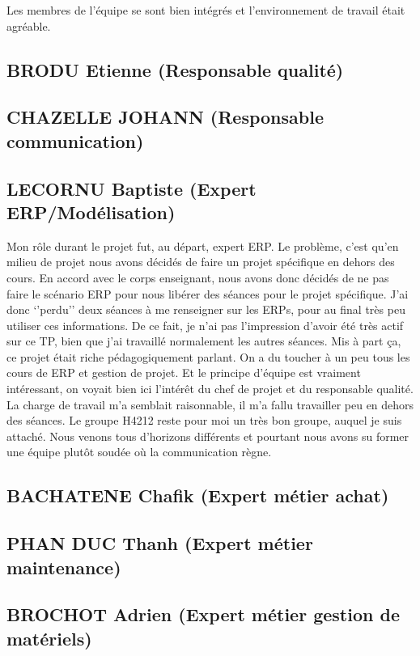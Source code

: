 Les membres de l'équipe se sont bien intégrés et l'environnement de travail était agréable.

       \subsection{BRODU Etienne (Responsable qualité)}

       \subsection{CHAZELLE JOHANN (Responsable communication)}

       \subsection{LECORNU Baptiste (Expert ERP/Modélisation)}
Mon rôle durant le projet fut, au départ, expert ERP. Le problème, c’est qu’en milieu de projet nous avons décidés de faire un projet spécifique en dehors des cours. En accord avec le corps enseignant, nous avons donc décidés de ne pas faire le scénario ERP pour nous libérer des séances pour le projet spécifique. J’ai donc ‘’perdu’’ deux séances à me renseigner sur les ERPs, pour au final très peu utiliser ces informations. De ce fait, je n’ai pas l’impression d’avoir été très actif sur ce TP, bien que j’ai travaillé normalement les autres séances. 
Mis à part ça, ce projet était riche pédagogiquement parlant. On a du toucher à un peu tous les cours de ERP et gestion de projet. Et le principe d’équipe est vraiment intéressant, on voyait bien ici l’intérêt du chef de projet et du responsable qualité.
La charge de travail m’a semblait raisonnable, il m’a fallu travailler peu en dehors des séances.
 Le groupe H4212 reste pour moi un très bon groupe, auquel je suis attaché. Nous venons tous d’horizons différents et pourtant nous avons su former une équipe plutôt soudée où la communication règne.

       \subsection{BACHATENE Chafik (Expert métier achat)}

       \subsection{PHAN DUC Thanh (Expert métier maintenance)}

       \subsection{BROCHOT Adrien (Expert métier gestion de matériels)}



